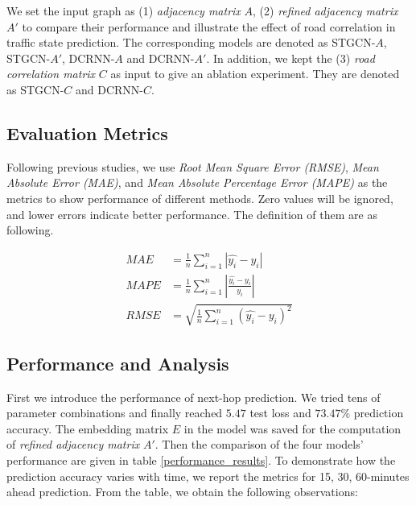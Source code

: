 We set the input graph as (1) \textit{adjacency matrix} $A$, (2) \textit{refined adjacency matrix} $A'$ to compare their performance and illustrate the effect of road correlation in traffic state prediction. The corresponding models are denoted as STGCN-$A$, STGCN-$A'$, DCRNN-$A$ and DCRNN-$A'$. In addition, we kept the (3) \textit{road correlation matrix} $C$ as input to give an ablation experiment. They are denoted as STGCN-$C$ and DCRNN-$C$.

\subsection{Evaluation Metrics}
Following previous studies, we use \textit{Root Mean Square Error (RMSE)}, \textit{Mean Absolute Error (MAE)}, and \textit{Mean Absolute Percentage Error (MAPE)} as the metrics to show performance of different methods. Zero values will be ignored, and lower errors indicate better performance. The definition of them are as following.

\begin{equation}
    \begin{aligned}
        MAE&=\frac 1n\sum_{i=1}^n|\hat{y_i}-y_i|\\
        MAPE&=\frac 1n\sum_{i=1}^n|\frac{\hat{y_i}-y_i}{y_i}|\\
        RMSE&=\sqrt{\frac 1n\sum_{i=1}^n(\hat{y_i}-y_i)^2}
    \end{aligned}
\end{equation}

\subsection{Performance and Analysis}
First we introduce the performance of next-hop prediction. We tried tens of parameter combinations and finally reached $5.47$ test loss and $73.47\%$ prediction accuracy. The embedding matrix $E$ in the model was saved for the computation of \textit{refined adjacency matrix} $A'$. Then the comparison of the four models' performance are given in table \ref{performance_results}. To demonstrate how the prediction accuracy varies with time, we report the metrics for 15, 30, 60-minutes ahead prediction. From the table, we obtain the following observations:


